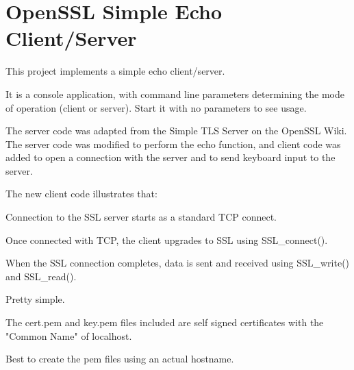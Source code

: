 \chapter{Open\+SSL Simple Echo Client/\+Server}
\hypertarget{md__c_1_2_users_2namph_2_downloads_2openssl_2openssl-3_82_81_2demos_2sslecho_2_r_e_a_d_m_e}{}\label{md__c_1_2_users_2namph_2_downloads_2openssl_2openssl-3_82_81_2demos_2sslecho_2_r_e_a_d_m_e}
This project implements a simple echo client/server.

It is a console application, with command line parameters determining the mode of operation (client or server). Start it with no parameters to see usage.

The server code was adapted from the Simple TLS Server on the Open\+SSL Wiki. The server code was modified to perform the echo function, and client code was added to open a connection with the server and to send keyboard input to the server.

The new client code illustrates that\+:


\begin{DoxyItemize}
\item Connection to the SSL server starts as a standard TCP \textquotesingle{}connect\textquotesingle{}.
\item Once connected with TCP, the client \textquotesingle{}upgrades\textquotesingle{} to SSL using SSL\+\_\+connect().
\item When the SSL connection completes, data is sent and received using SSL\+\_\+write() and SSL\+\_\+read().
\item Pretty simple.
\end{DoxyItemize}

The cert.\+pem and key.\+pem files included are self signed certificates with the "{}\+Common Name"{} of \textquotesingle{}localhost\textquotesingle{}.

Best to create the \textquotesingle{}pem\textquotesingle{} files using an actual hostname. 